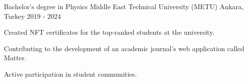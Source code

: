 

\begin{cventries}
  \cventry
    {Bachelor's degree in Physics} %
    {Middle East Technical University (METU)} %
    {Ankara, Turkey} %
    {2019 - 2024} %
        {
      \begin{cvitems} %
        \item {Created NFT certificates for the top-ranked students at the university.}
        \item {Contributing to the development of an academic journal's web application called Matter.}
        \item {Active participation in student communities.}
      \end{cvitems}
    }
  
\end{cventries}